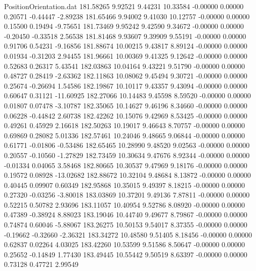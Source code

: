 \begin{filecontents}{PositionOrientation.dat}
 181.58265    9.92521    9.44231    10.33584   -0.00000    0.00000    0.20571   -0.44447   -2.89238
 181.65466    9.94002    9.41030    10.12757   -0.00000    0.00000    0.15500    0.19494   -9.75651
 181.73469    9.95242    9.42590     9.34672   -0.00000    0.00000   -0.20450   -0.33518    2.56538
 181.81468    9.93607    9.39909     9.55191   -0.00000    0.00000    0.91706    0.54231   -9.16856
 181.88674   10.00215    9.43817     8.89124   -0.00000    0.00000    0.01934   -0.31203    2.94455
 181.96661   10.00369    9.41325     9.12642   -0.00000    0.00000    0.52683    0.26317    5.43541
 182.03863   10.04164    9.43221     9.51790   -0.00000    0.00000    0.48727    0.28419   -2.63362
 182.11863   10.08062    9.45494     9.30721   -0.00000    0.00000    0.25674   -0.26694    1.54586
 182.19867   10.10117    9.43357     9.43094   -0.00000    0.00000    0.60647    0.31121  -11.60925
 182.27066   10.14483    9.45598     8.59520   -0.00000    0.00000    0.01807    0.07478   -3.10787
 182.35065   10.14627    9.46196     8.34660   -0.00000    0.00000    0.06228   -0.44842    2.60738
 182.42262   10.15076    9.42969     8.53425   -0.00000    0.00000    0.49261    0.45929    2.16618
 182.50263   10.19017    9.46643     8.70757   -0.00000    0.00000    0.69869    0.28082    5.01336
 182.57461   10.24046    9.48665     9.06844   -0.00000    0.00000    0.61771   -0.01806   -0.53486
 182.65465   10.28990    9.48520     9.02563   -0.00000    0.00000    0.20557   -0.10560   -1.27829
 182.73459   10.30634    9.47676     8.92344   -0.00000    0.00000   -0.01334    0.04065    3.58468
 182.80665   10.30537    9.47969     9.18176   -0.00000    0.00000    0.19572    0.08928  -13.02682
 182.88672   10.32104    9.48684     8.13872   -0.00000    0.00000    0.40445    0.09907    0.60349
 182.95868   10.35015    9.49397     8.18215   -0.00000    0.00000    0.27320   -0.03256   -3.80018
 183.03869   10.37201    9.49136     7.87811   -0.00000    0.00000    0.52215    0.50782    2.93696
 183.11057   10.40954    9.52786     8.08920   -0.00000    0.00000    0.47389   -0.38924    8.88023
 183.19046   10.44740    9.49677     8.79867   -0.00000    0.00000    0.74874    0.60046   -5.88067
 183.26275   10.50153    9.54017     8.37355   -0.00000    0.00000   -0.19662   -0.32660   -2.36321
 183.34272   10.48580    9.51405     8.18456   -0.00000    0.00000    0.62837    0.02264    4.03025
 183.42260   10.53599    9.51586     8.50647   -0.00000    0.00000    0.25652   -0.14849    1.77430
 183.49445   10.55442    9.50519     8.63397   -0.00000    0.00000    0.73128    0.47721    2.99549

\end{filecontents}
